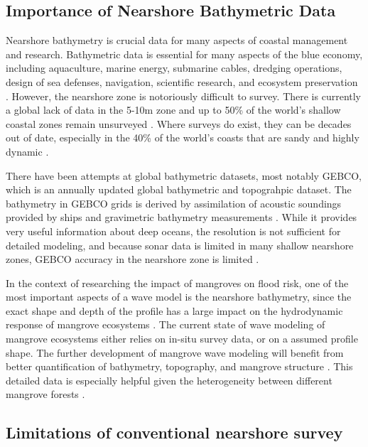 \subsection{Importance of Nearshore Bathymetric Data}

Nearshore bathymetry is crucial data for many aspects of coastal management and research. Bathymetric data is essential for many aspects of the blue economy, including aquaculture, marine energy, submarine cables, dredging operations, design of sea defenses, navigation, scientific research, and ecosystem preservation \parencite{Cesbron2021,Ashphaq2021}. However, the nearshore zone is notoriously difficult to survey. There is currently a global lack of data in the 5-10m zone \parencite{Albright2021} and up to 50\% of the world's shallow coastal zones remain unsurveyed \parencite{IHO/OHI2022}. Where surveys do exist, they can be decades out of date, especially in the 40\% of the world's coasts that are sandy and highly dynamic \parencite{Almar2021e}.

There have been attempts at global bathymetric datasets, most notably GEBCO, which is an annually updated global bathymetric and topograhpic dataset. The bathymetry in GEBCO grids is derived by assimilation of acoustic soundings provided by ships and gravimetric bathymetry measurements \parencite{Cesbron2021}. While it provides very useful information about deep oceans, the resolution is not sufficient for detailed modeling, and because sonar data is limited in many shallow nearshore zones, GEBCO accuracy in the nearshore zone is limited \parencite{Monteys2015}. 

In the context of researching the impact of mangroves on flood risk, one of the most important aspects of a wave model is the nearshore bathymetry, since the exact shape and depth of the profile has a large impact on the hydrodynamic response of mangrove ecosystems \parencite{Horstman2014,Maza2019}. The current state of wave modeling of mangrove ecosystems either relies on in-situ survey data, or on a assumed profile shape. The further development of mangrove wave modeling will benefit from better quantification of bathymetry, topography, and mangrove structure \parencite{Menendez2020}. This detailed data is especially helpful given the heterogeneity between different mangrove forests \parencite{Mazda2013}.


\subsection{Limitations of conventional nearshore survey}

